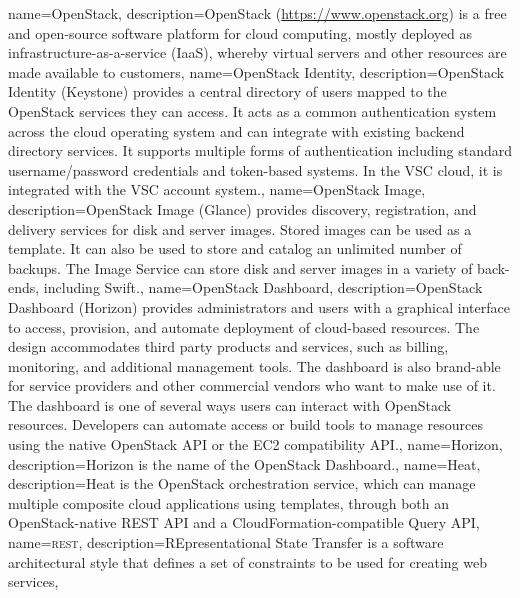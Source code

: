 { name={OpenStack},
  description={OpenStack (\url{https://www.openstack.org}) is a free
    and open-source software platform for cloud computing, mostly
    deployed as infrastructure-as-a-service (IaaS), whereby virtual
    servers and other resources are made available to customers}, }
{ name={OpenStack Identity},
  description={OpenStack Identity (Keystone) provides a central
    directory of users mapped to the OpenStack services they can
    access. It acts as a common authentication system across the cloud
    operating system and can integrate with existing backend directory
    services. It supports multiple forms of authentication including
    standard username/password credentials and token-based systems.
    In the VSC cloud, it is integrated with the VSC account system.},
}
{
  name={OpenStack Image},
  description={OpenStack Image (Glance) provides discovery,
  registration, and delivery services for disk and server images. Stored
  images can be used as a template. It can also be used to store and
  catalog an unlimited number of backups. The Image Service can store
  disk and server images in a variety of back-ends, including Swift.},
}
{
  name={OpenStack Dashboard},
  description={OpenStack Dashboard (Horizon) provides administrators and
  users with a graphical interface to access, provision, and automate
  deployment of cloud-based resources. The design accommodates third
  party products and services, such as billing, monitoring, and
  additional management tools. The dashboard is also brand-able for
  service providers and other commercial vendors who want to make use of
  it. The dashboard is one of several ways users can interact with
  OpenStack resources. Developers can automate access or build tools to
  manage resources using the native OpenStack API or the EC2
  compatibility API.},
}
{
  name={Horizon},
  description={Horizon is the name of the \gls{OpenStack Dashboard}.},
}
{
  name={Heat},
  description={Heat is the OpenStack orchestration service, which can
  manage multiple composite cloud applications using templates,
  through both an OpenStack-native \gls{REST} API and a
  CloudFormation-compatible Query API},
}
{
  name={\textsc{rest}},
  description={REpresentational State Transfer is a software
  architectural style that defines a set of constraints to be used for
  creating web services},
}

